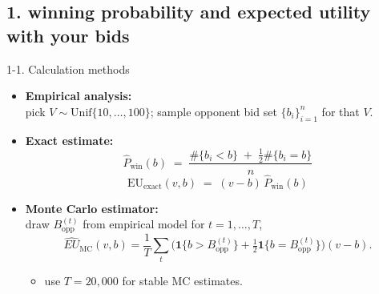\documentclass{beamer}
\begin{document}

\subsection{1. winning probability and expected utility with your bids}
\begin{frame}{1-1. Calculation methods}
\medskip
\begin{itemize}
  \item \textbf{Empirical analysis:}\\
  pick $V\sim\mathrm{Unif}\{10,\dots,100\}$; sample opponent bid set $\{b_i\}_{i=1}^n$ for that $V$.
  \item \textbf{Exact estimate:}\\
    {\centering
    \[
    \widehat{P}_{\mathrm{win}}(b)
    \;=\;\frac{\#\{b_i < b\} \;+\; \tfrac{1}{2}\#\{b_i = b\}}{n}
    \]
    \[
    \mathrm{EU}_{\mathrm{exact}}(v,b)
    \;=\; (v - b)\,\widehat{P}_{\mathrm{win}}(b)
    \]}
  \item \textbf{Monte Carlo estimator:} \\
  draw $B_{\text{opp}}^{(t)}$ from empirical model for $t=1,\dots,T$,
    \[
      \widehat{EU}_{\text{MC}}(v,b)=\frac{1}{T}\sum_{t}\Big(\mathbf{1}\{b>B_{\text{opp}}^{(t)}\}+\tfrac12\mathbf{1}\{b=B_{\text{opp}}^{(t)}\}\Big)(v-b).
    \]
    \begin{itemize}
        \item use $T=20{,}000$ for stable MC estimates.
    \end{itemize}
\end{itemize}
\end{frame}
\end{document}
